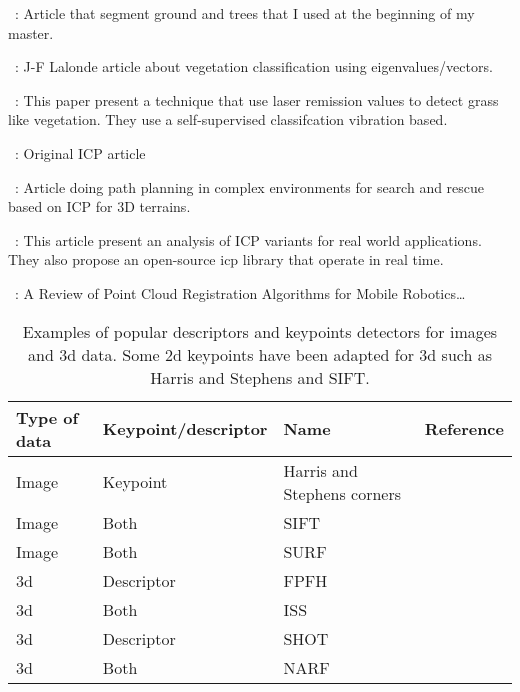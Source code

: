 ~\cite{Mcdaniel2012}:
Article that segment ground and trees that I used at the beginning of my master. 

~\cite{Lalonde2006}:
J-F Lalonde article about vegetation classification using eigenvalues/vectors. 

~\cite{Wurm2009}:
This paper present a technique that use laser remission values to detect grass like vegetation. They use a self-supervised classifcation vibration based. 

~\cite{Besl1992}:
Original ICP article

~\cite{Colas2013}:
Article doing path planning in complex environments for search and rescue based on ICP for 3D terrains. 

~\cite{Pomerleau2013}:
This article present an analysis of ICP variants for real world applications. They also propose an open-source icp library that operate in real time.  

~\cite{Pomerleau2015a}:
A Review of Point Cloud Registration Algorithms for Mobile Robotics\dots


\begin{table}[H]
    \centering
    \begin{tabular}{@{}llll@{}}
        \toprule
        \textbf{Type of data}  & \textbf{Keypoint/descriptor} & \textbf{Name}               & \textbf{Reference} \\
        \hline
        Image                  & Keypoint                     & Harris and Stephens corners & \cite{Harris1988}  \\
        Image                  & Both                         & SIFT                        & \cite{Lowe2004}    \\
        Image                  & Both                         & SURF                        & \cite{Bay2006}     \\
        \gls*{3d}              & Descriptor                   & FPFH                        & \cite{Rusu2009}    \\
        \gls*{3d}              & Both                         & ISS                         & \cite{Yu2009}      \\
        \gls*{3d}              & Descriptor                   & SHOT                        & \cite{Tombari2010} \\
        \gls*{3d}              & Both                         & NARF                        & \cite{Steder2011a} \\
        \bottomrule
    \end{tabular}
    \caption{ Examples of popular descriptors and keypoints detectors for images and \gls*{3d} data. Some \gls*{2d} keypoints have been adapted for \gls*{3d} such as Harris and Stephens and SIFT.}
    \label{tab:features_examples}
\end{table}
